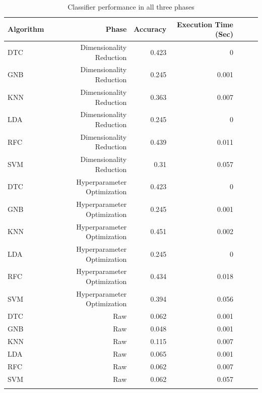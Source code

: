 \documentclass[conference,onecolumn]{IEEEtran}
\begin{document}
    \begin{longtable}{lrrrrrr}
        \hline
         Algorithm   & Phase                        & Accuracy   & Execution Time (Sec) \\ \hline
         DTC         & Dimensionality Reduction     & 0.423      & 0     \\
         GNB         & Dimensionality Reduction     & 0.245      & 0.001 \\
         KNN         & Dimensionality Reduction     & 0.363      & 0.007 \\
         LDA         & Dimensionality Reduction     & 0.245      & 0     \\
         RFC         & Dimensionality Reduction     & 0.439      & 0.011 \\
         SVM         & Dimensionality Reduction     & 0.31       & 0.057 \\
         DTC         & Hyperparameter Optimization  & 0.423      & 0     \\
         GNB         & Hyperparameter Optimization  & 0.245      & 0.001 \\
         KNN         & Hyperparameter Optimization  & 0.451      & 0.002 \\
         LDA         & Hyperparameter Optimization  & 0.245      & 0     \\
         RFC         & Hyperparameter Optimization  & 0.434      & 0.018 \\
         SVM         & Hyperparameter Optimization  & 0.394      & 0.056 \\
         DTC         & Raw                          & 0.062      & 0.001 \\
         GNB         & Raw                          & 0.048      & 0.001 \\
         KNN         & Raw                          & 0.115      & 0.007 \\
         LDA         & Raw                          & 0.065      & 0.001 \\
         RFC         & Raw                          & 0.062      & 0.007 \\
         SVM         & Raw                          & 0.062      & 0.057 \\
        \hline
        \caption{Classifier performance in all three phases}
        \label{appdx:classifierPerformanceInAllThreePhases}
    \end{longtable}
\end{document}
